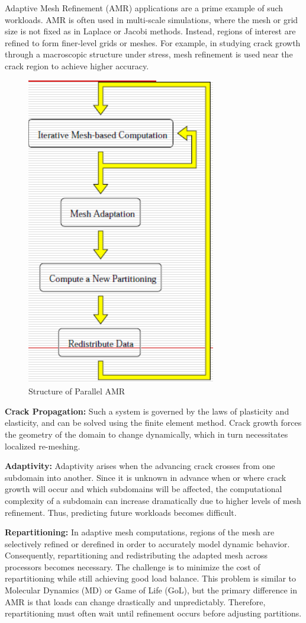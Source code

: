 \documentclass[12pt]{book}
\begin{document}
Adaptive Mesh Refinement (AMR) applications are a prime example of such workloads. AMR is often used in multi-scale simulations, where the mesh or grid size is not fixed as in Laplace or Jacobi methods. Instead, regions of interest are refined to form finer-level grids or meshes. For example, in studying crack growth through a macroscopic structure under stress, mesh refinement is used near the crack region to achieve higher accuracy.
\begin{figure}[ht]
    \centering
    \includegraphics[width=0.45\linewidth]{images/llAMR.png}
    \caption{Structure of Parallel AMR}
    \label{fig:llAMR}
\end{figure}
\textbf{Crack Propagation:} Such a system is governed by the laws of plasticity and elasticity, and can be solved using the finite element method. Crack growth forces the geometry of the domain to change dynamically, which in turn necessitates localized re-meshing. 

\textbf{Adaptivity:} Adaptivity arises when the advancing crack crosses from one subdomain into another. Since it is unknown in advance when or where crack growth will occur and which subdomains will be affected, the computational complexity of a subdomain can increase dramatically due to higher levels of mesh refinement. Thus, predicting future workloads becomes difficult.

\textbf{Repartitioning:} In adaptive mesh computations, regions of the mesh are selectively refined or derefined in order to accurately model dynamic behavior. Consequently, repartitioning and redistributing the adapted mesh across processors becomes necessary. The challenge is to minimize the cost of repartitioning while still achieving good load balance. This problem is similar to Molecular Dynamics (MD) or Game of Life (GoL), but the primary difference in AMR is that loads can change drastically and unpredictably. Therefore, repartitioning must often wait until refinement occurs before adjusting partitions. 
\end{document}
